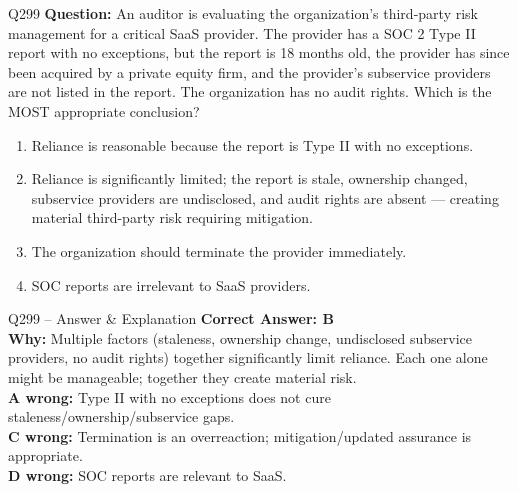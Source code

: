 \documentclass[aspectratio=169,10pt]{beamer}
\begin{document}
	\begin{frame}[t]{Q299}
		\small
		\textbf{Question:} An auditor is evaluating the organization's third-party risk management for a critical SaaS provider. The provider has a SOC 2 Type II report with no exceptions, but the report is 18 months old, the provider has since been acquired by a private equity firm, and the provider's subservice providers are not listed in the report. The organization has no audit rights. Which is the MOST appropriate conclusion?
		\begin{enumerate}[label=\Alph*.,itemsep=1pt,topsep=2pt]
			\item Reliance is reasonable because the report is Type II with no exceptions.
			\item Reliance is significantly limited; the report is stale, ownership changed, subservice providers are undisclosed, and audit rights are absent — creating material third-party risk requiring mitigation.
			\item The organization should terminate the provider immediately.
			\item SOC reports are irrelevant to SaaS providers.
		\end{enumerate}
	\end{frame}
	
	\begin{frame}[t]{Q299 -- Answer \& Explanation}
		\small
		\textbf{Correct Answer: B} \\[4pt]
		\textbf{Why:} Multiple factors (staleness, ownership change, undisclosed subservice providers, no audit rights) together significantly limit reliance. Each one alone might be manageable; together they create material risk. \\[4pt]
		\textbf{A wrong:} Type II with no exceptions does not cure staleness/ownership/subservice gaps. \\[2pt]
		\textbf{C wrong:} Termination is an overreaction; mitigation/updated assurance is appropriate. \\[2pt]
		\textbf{D wrong:} SOC reports are relevant to SaaS.
	\end{frame}
	
\end{document}
